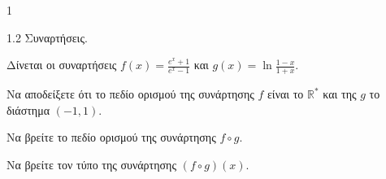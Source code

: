 \begin{ylh}{1}
    \item 1.2 Συναρτήσεις.
\end{ylh}
Δίνεται οι συναρτήσεις $f(x) = \frac{e^x+1}{e^x-1}$ και $g(x) = \ln \frac{1-x}{1+x}$.
\begin{alist}
\item Να αποδείξετε ότι το πεδίο ορισμού της συνάρτησης $f$ είναι το $\mathbb{R}^*$ και της $g$ το διάστημα $(-1, 1)$. 
\item Να βρείτε το πεδίο ορισμού της συνάρτησης $f \circ g$. 
\item Να βρείτε τον τύπο της συνάρτησης $(f \circ g)(x)$. 
\end{alist}